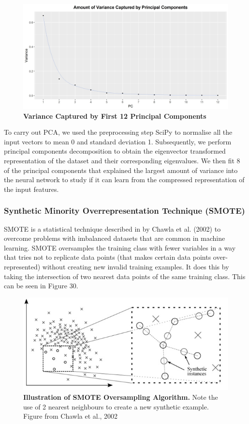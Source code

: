\documentclass{article}
\begin{document}
\begin{figure}[H]
\includegraphics[width=\textwidth]{variancecapturedbypc.jpg}
\caption{\textbf{Variance Captured by First 12 Principal Components}}
\centering
\end{figure}

To carry out PCA, we used the preprocessing step SciPy to normalise all the input vectors to mean 0 and standard deviation 1. Subsequently, we perform principal components decomposition to obtain the eigenvector transformed representation of the dataset and their corresponding eigenvalues. We then fit 8 of the principal components that explained the largest amount of variance into the neural network to study if it can learn from the compressed representation of the input features. 
\subsubsection{Synthetic Minority Overrepresentation Technique (SMOTE)}
SMOTE is a statistical technique described in by Chawla et al. (2002) to overcome problems with imbalanced datasets that are common in machine learning. SMOTE oversamples the training class with fewer variables in a way that tries not to replicate data points (that makes certain data points over-represented) without creating new invalid training examples. It does this by taking the intersection of two nearest data points of the same training class. This can be seen in Figure 30. 

\begin{figure}[H]
\includegraphics[width=\textwidth]{smoteoversampling.jpg}
\caption{\textbf{Illustration of SMOTE Oversampling Algorithm.} Note the use of 2 nearest neighbours to create a new synthetic example. Figure from Chawla et al., 2002}
\centering
\end{figure}
\end{document}
